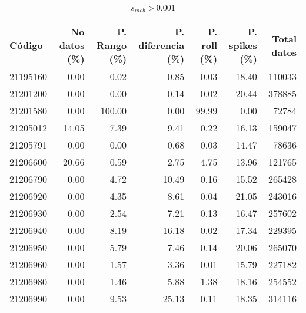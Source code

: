 \documentclass[11pt]{article}
\begin{document}
\begin{enumerate}
\begin{center}
\begin{equation}\label{eq:desv_est}
	s_{mob} > 0.001
\end{equation}
\end{center}

\end{enumerate}

\begin{table}[H]
\begin{center}


\begin{tabular}{lrrrrrr}
\toprule
      Código &  No datos (\%) &  P. Rango (\%) &  P. diferencia (\%) &  P. roll (\%) &  P. spikes (\%) & Total datos \\
\midrule
 21195160 &       0.00 &      0.02 &           0.85 &     0.03 &      18.40 &        110033 \\
 21201200 &       0.00 &      0.00 &           0.14 &     0.02 &      20.44 &        378885 \\
 21201580 &       0.00 &    100.00 &           0.00 &    99.99 &       0.00 &         72784 \\
 21205012 &      14.05 &      7.39 &           9.41 &     0.22 &      16.13 &        159047 \\
 21205791 &       0.00 &      0.00 &           0.68 &     0.03 &      14.47 &         78636 \\
 21206600 &      20.66 &      0.59 &           2.75 &     4.75 &      13.96 &        121765 \\
 21206790 &       0.00 &      4.72 &          10.49 &     0.16 &      15.52 &        265428 \\
 21206920 &       0.00 &      4.35 &           8.61 &     0.04 &      21.05 &        243016 \\
 21206930 &       0.00 &      2.54 &           7.21 &     0.13 &      16.47 &        257602 \\
 21206940 &       0.00 &      8.19 &          16.18 &     0.02 &      17.34 &        229395 \\
 21206950 &       0.00 &      5.79 &           7.46 &     0.14 &      20.06 &        265070 \\
 21206960 &       0.00 &      1.57 &           3.36 &     0.01 &      15.79 &        227182 \\
 21206980 &       0.00 &      1.46 &           5.88 &     1.38 &      18.16 &        254552 \\
 21206990 &       0.00 &      9.53 &          25.13 &     0.11 &      18.35 &        314116 \\

\end{tabular}
\end{center}
\end{table}
\end{document}
